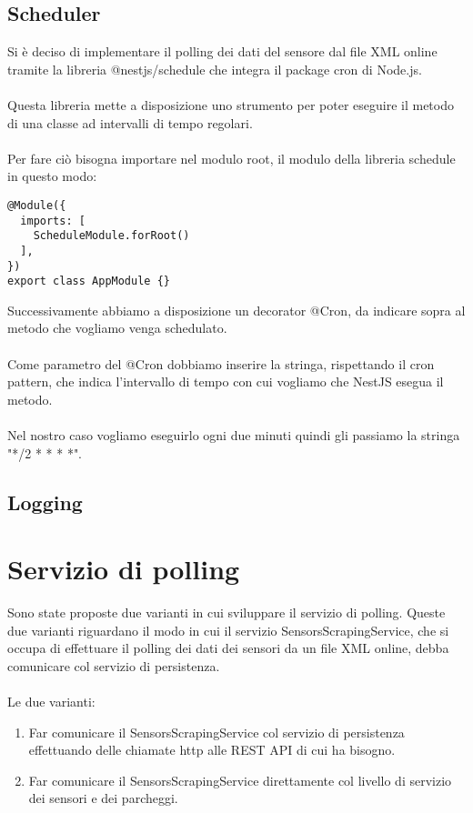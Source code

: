 \subsection{Scheduler}
Si è deciso di implementare il polling dei dati del sensore dal file XML online
tramite la libreria @nestjs/schedule che integra il package cron di Node.js.
\\\\
Questa libreria mette a disposizione uno strumento per poter eseguire il metodo
di una classe ad intervalli di tempo regolari.
\\\\
Per fare ciò bisogna importare nel modulo root, il modulo della libreria schedule in questo modo:
\begin{lstlisting}
@Module({
  imports: [
    ScheduleModule.forRoot()
  ],
})
export class AppModule {}
\end{lstlisting}
\leavevmode\newline
Successivamente abbiamo a disposizione un decorator @Cron, da indicare sopra al metodo che vogliamo venga 
schedulato. 
\\\\
Come parametro del @Cron dobbiamo inserire la stringa, rispettando il cron pattern, che indica
l'intervallo di tempo con cui vogliamo che NestJS esegua il metodo.
\\\\
Nel nostro caso vogliamo eseguirlo ogni due minuti quindi gli passiamo la stringa "*/2 * * * *".

\subsection{Logging}

\section{Servizio di polling}
Sono state proposte due varianti in cui sviluppare il servizio di polling. Queste due varianti riguardano il
modo in cui il servizio SensorsScrapingService, che si occupa di effettuare il polling dei dati dei sensori
da un file XML online, debba comunicare col servizio di persistenza.
\\\\
Le due varianti:
\begin{enumerate}
    \item Far comunicare il SensorsScrapingService col servizio di persistenza effettuando delle chiamate http 
        alle REST API di cui ha bisogno.
    \item Far comunicare il SensorsScrapingService direttamente col livello di servizio dei sensori e dei parcheggi.
\end{enumerate}
\leavevmode\newline

